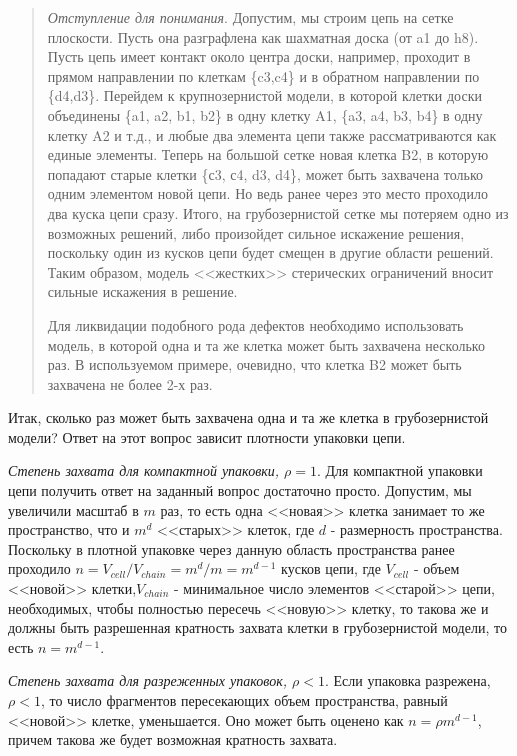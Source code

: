 \documentclass[tikz,a4paper]{scrartcl} %
\begin{document}
\begin{quote} \textit{Отступление для понимания}. 
Допустим, мы строим цепь на сетке плоскости. Пусть она разграфлена как шахматная доска (от a1 до h8). Пусть цепь имеет контакт около центра доски, например, проходит в прямом направлении по клеткам \{c3,c4\} и в обратном направлении по \{d4,d3\}. Перейдем к крупнозернистой модели, в которой клетки доски объединены \{a1, a2, b1, b2\} в одну клетку A1, \{a3, a4, b3, b4\} в одну клетку A2 и т.д., и любые два элемента цепи также рассматриваются как единые элементы. Теперь на большой сетке новая клетка B2, в которую попадают старые клетки \{с3, с4, d3, d4\}, может быть захвачена только одним элементом новой цепи. Но ведь ранее через это место проходило два куска цепи сразу. Итого, на грубозернистой сетке мы потеряем одно из возможных решений, либо произойдет сильное искажение решения, поскольку один из кусков цепи будет смещен в другие области решений. Таким образом, модель <<жестких>> стерических ограничений вносит сильные искажения в решение. 

Для ликвидации подобного рода дефектов необходимо использовать модель, в которой одна и та же клетка может быть захвачена несколько раз. В используемом примере, очевидно, что клетка B2 может быть захвачена не более 2-х раз.
\end{quote}

Итак, сколько раз может быть захвачена одна и та же клетка в грубозернистой модели?  Ответ на этот вопрос зависит плотности упаковки цепи. 

\textit{Степень захвата для компактной упаковки, $\rho = 1$}. Для компактной упаковки цепи получить ответ на заданный вопрос достаточно просто. Допустим, мы увеличили масштаб в $m$ раз, то есть одна <<новая>> клетка занимает то же пространство, что и $m^d$ <<старых>> клеток, где $d$ - размерность пространства. Поскольку в плотной упаковке через данную область пространства ранее проходило $n = V_{cell}/V_{chain} = m^d/m = m^{d-1}$ кусков цепи, где $V_{cell}$ - объем <<новой>> клетки,$V_{chain}$ - минимальное число элементов <<старой>> цепи, необходимых, чтобы полностью пересечь <<новую>> клетку, то такова же и должны быть разрешенная кратность захвата клетки в грубозернистой модели, то есть $n = m^{d-1}$.

\textit{Степень захвата для разреженных упаковок, $\rho < 1$}. Если упаковка разрежена, $\rho < 1$, то число фрагментов пересекающих объем пространства, равный <<новой>> клетке, уменьшается. Оно может быть оценено как $n = \rho m^{d-1}$, причем такова же будет возможная кратность захвата.
\end{document}

